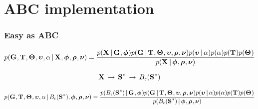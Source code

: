 \section{ABC implementation}

\begin{frame}
    \frametitle{Easy as ABC}
    \begin{displaybox}
        \footnotesize
        \[
            p(\geneTreeVector, \divTimeMapVector, \demographicParamVector, 
            \locusMutationRateScalarVector, \locusRateHetShapeParameter \given
            \alignmentVector, \hkyModelVector, \ploidyScalarVector,
            \mutationRateScalarConstantVector) =
            \frac{p(\alignmentVector \given \geneTreeVector, \hkyModelVector)
                p(\geneTreeVector \given \divTimeMapVector, \demographicParamVector,
                \locusMutationRateScalarVector, \ploidyScalarVector,
                \mutationRateScalarConstantVector)
                p(\locusMutationRateScalarVector \given \locusRateHetShapeParameter)
                p(\locusRateHetShapeParameter)
                p(\divTimeMapVector)
                p(\demographicParamVector)}{
                p(\alignmentVector \given \hkyModelVector, \ploidyScalarVector,
                \mutationRateScalarConstantVector)}
        \]\vspace{0mm}
    \end{displaybox}

    \[ \alignmentVector \, \to \, \ssVectorObs \, \to \, \ssSpace\]

    \begin{displaybox}
        \footnotesize
        \[
            p(\geneTreeVector, \divTimeMapVector, \demographicParamVector, 
            \locusMutationRateScalarVector, \locusRateHetShapeParameter \given
            \ssSpace, \hkyModelVector, \ploidyScalarVector,
            \mutationRateScalarConstantVector) =
            \frac{p(\ssSpace \given \geneTreeVector, \hkyModelVector)
                p(\geneTreeVector \given \divTimeMapVector, \demographicParamVector,
                \locusMutationRateScalarVector, \ploidyScalarVector,
                \mutationRateScalarConstantVector)
                p(\locusMutationRateScalarVector \given \locusRateHetShapeParameter)
                p(\locusRateHetShapeParameter)
                p(\divTimeMapVector)
                p(\demographicParamVector)}{
                p(\ssSpace \given \hkyModelVector, \ploidyScalarVector,
                \mutationRateScalarConstantVector)}
        \]\vspace{0mm}
    \end{displaybox}
\end{frame}

